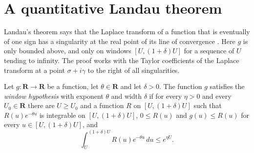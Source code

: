 \section{A quantitative Landau theorem}\label{section-wl-landau}

Landau's theorem \cite{Lan05} says that the Laplace transform of a function
that is eventually of one sign has a singularity at the real point of its
line of convergence \cite[Chapter V]{Ing32}. Here $g$ is only bounded above,
and only on windows $[U,(1+\delta)U]$ for a sequence of $U$ tending to
infinity. The proof works with the Taylor coefficients of the Laplace
transform at a point $\sigma+i\gamma$ to the right of all singularities.

\begin{definition}\label{wl-window-hypothesis}
Let $g:\mathbf R\to\mathbf R$ be a function, let $\theta\in\mathbf R$ and let
$\delta>0$. The function $g$ satisfies the \emph{window hypothesis} with
exponent $\theta$ and width $\delta$ if for every $\eta>0$ and every
$U_0\in\mathbf R$ there are $U\geq U_0$ and a function $R$ on
$[U,(1+\delta)U]$ such that $R(u)e^{-\theta u}$ is integrable on
$[U,(1+\delta)U]$, $0\leq R(u)$ and $g(u)\leq R(u)$ for every
$u\in[U,(1+\delta)U]$, and
\[
 \int_U^{(1+\delta)U}R(u)e^{-\theta u}\,du\leq e^{\eta U}.
\]
\end{definition}


